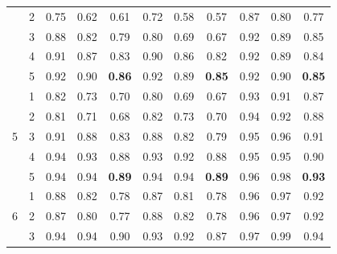\documentclass[12pt]{article}
\begin{document}
\begin{table}[H]
\begin{tabular}{rrrrrrrrrrr}
            \multicolumn{1}{c}{} & \multicolumn{1}{c}{2}& 0.75 & 0.62 & \multicolumn{1}{c}{0.61} & 0.72 & 0.58 & \multicolumn{1}{c}{0.57} & 0.87 & 0.80 & \multicolumn{1}{c}{0.77}   \\
            \multicolumn{1}{c}{} & \multicolumn{1}{c}{3}& 0.88 & 0.82 & \multicolumn{1}{c}{0.79} & 0.80 & 0.69 & \multicolumn{1}{c}{0.67} & 0.92 & 0.89 & \multicolumn{1}{c}{0.85}   \\
            \multicolumn{1}{c}{} & \multicolumn{1}{c}{4}& 0.91 & 0.87 & \multicolumn{1}{c}{0.83} & 0.90 & 0.86 & \multicolumn{1}{c}{0.82} & 0.92 & 0.89 & \multicolumn{1}{c}{0.84}   \\
            \multicolumn{1}{c}{} & \multicolumn{1}{c}{5}& 0.92 & 0.90 & \multicolumn{1}{c}{\textbf{0.86}} & 0.92 & 0.89 & \multicolumn{1}{c}{\textbf{0.85}} & 0.92 & 0.90 & \multicolumn{1}{c}{\textbf{0.85}} \\
            \hline
            \multicolumn{1}{c}{\multirow{5}{*}{5}} & \multicolumn{1}{c}{1}& 0.82 & 0.73 & \multicolumn{1}{c}{0.70} & 0.80 & 0.69 & \multicolumn{1}{c}{0.67} & 0.93 & 0.91 & \multicolumn{1}{c}{0.87} \\
            \multicolumn{1}{c}{} & \multicolumn{1}{c}{2}& 0.81 & 0.71 & \multicolumn{1}{c}{0.68} & 0.82 & 0.73 & \multicolumn{1}{c}{0.70} & 0.94 & 0.92 & \multicolumn{1}{c}{0.88} \\
            \multicolumn{1}{c}{} & \multicolumn{1}{c}{3}& 0.91 & 0.88 & \multicolumn{1}{c}{0.83} & 0.88 & 0.82 & \multicolumn{1}{c}{0.79} & 0.95 & 0.96 & \multicolumn{1}{c}{0.91} \\
            \multicolumn{1}{c}{} & \multicolumn{1}{c}{4}& 0.94 & 0.93 & \multicolumn{1}{c}{0.88} & 0.93 & 0.92 & \multicolumn{1}{c}{0.88} & 0.95 & 0.95 & \multicolumn{1}{c}{0.90}  \\
            \multicolumn{1}{c}{} & \multicolumn{1}{c}{5}& 0.94 & 0.94 & \multicolumn{1}{c}{\textbf{0.89}} & 0.94 & 0.94 & \multicolumn{1}{c}{\textbf{0.89}} & 0.96 & 0.98 & \multicolumn{1}{c}{\textbf{0.93}}  \\
            \hline
            \multicolumn{1}{c}{\multirow{5}{*}{6}} & \multicolumn{1}{c}{1}& 0.88 & 0.82 & \multicolumn{1}{c}{0.78} & 0.87 & 0.81 & \multicolumn{1}{c}{0.78} & 0.96 & 0.97 & \multicolumn{1}{c}{0.92}  \\
            \multicolumn{1}{c}{} & \multicolumn{1}{c}{2}& 0.87 & 0.80 & \multicolumn{1}{c}{0.77} & 0.88 & 0.82 & \multicolumn{1}{c}{0.78} & 0.96 & 0.97 & \multicolumn{1}{c}{0.92}  \\
            \multicolumn{1}{c}{} & \multicolumn{1}{c}{3}& 0.94 & 0.94 & \multicolumn{1}{c}{0.90} & 0.93 & 0.92 & \multicolumn{1}{c}{0.87}  & 0.97 & 0.99 & \multicolumn{1}{c}{0.94} \\

\end{tabular}
\end{table}
\end{document}
